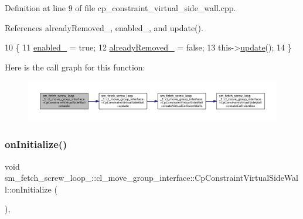 Definition at line 9 of file cp\+\_\+constraint\+\_\+virtual\+\_\+side\+\_\+wall.\+cpp.



References already\+Removed\+\_\+, enabled\+\_\+, and update().


\begin{DoxyCode}
10         \{
11             \hyperlink{classsm__fetch__screw__loop__1_1_1cl__move__group__interface_1_1CpConstraintVirtualSideWall_a9d17ffd44fe6739ea5e5e4113d470a60}{enabled\_} = \textcolor{keyword}{true};
12             \hyperlink{classsm__fetch__screw__loop__1_1_1cl__move__group__interface_1_1CpConstraintVirtualSideWall_aabc81a5e528f1e9c72e2ee12c4a9740f}{alreadyRemoved\_} = \textcolor{keyword}{false};
13             this->\hyperlink{classsm__fetch__screw__loop__1_1_1cl__move__group__interface_1_1CpConstraintVirtualSideWall_a86d9dd2c82600e9b175ee0e456c797a8}{update}();
14         \}
\end{DoxyCode}
Here is the call graph for this function\+:
\nopagebreak
\begin{figure}[H]
\begin{center}
\leavevmode
\includegraphics[width=350pt]{classsm__fetch__screw__loop__1_1_1cl__move__group__interface_1_1CpConstraintVirtualSideWall_a99e6ff416d9da148461a7e46ee6b4449_cgraph}
\end{center}
\end{figure}
\mbox{\label{classsm__fetch__screw__loop__1_1_1cl__move__group__interface_1_1CpConstraintVirtualSideWall_a1dcf39e1ad5ddbbec29a278677a2c680}} 
\subsubsection{\texorpdfstring{on\+Initialize()}{onInitialize()}}
{\footnotesize\ttfamily void sm\+\_\+fetch\+\_\+screw\+\_\+loop\+\_\+::cl\+\_\+move\+\_\+group\+\_\+interface\+::\+Cp\+Constraint\+Virtual\+Side\+Wall\+::on\+Initialize (\begin{DoxyParamCaption}{ }\end{DoxyParamCaption})\hspace{0.3cm}{\ttfamily [override]}, {\ttfamily [virtual]}}



